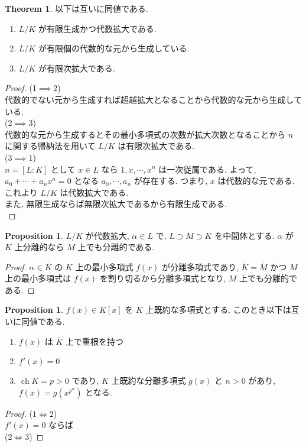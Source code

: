 \documentclass[a4paper,dvipdfmx]{jsarticle}
\DeclareMathOperator{\ch}{ch}
\theoremstyle{plain}
\theoremstyle{definition}
\theoremstyle{plain}
\numberwithin{equation}{section}
\numberwithin{theorem}{section}
\numberwithin{definition}{section}
\numberwithin{note}{section}
\theoremstyle{definition}
\newtheorem{prop}[dfn]{Proposition}
\newtheorem{thm}[dfn]{Theorem}
\begin{document}
\begin{thm}
  以下は互いに同値である.
  \begin{enumerate}
    \item $L/K$ が有限生成かつ代数拡大である.
    \item $L/K$ が有限個の代数的な元から生成している.
    \item $L/K$ が有限次拡大である.
  \end{enumerate}
\end{thm}
\begin{proof}
  (1$\implies$2) \\
  代数的でない元から生成すれば超越拡大となることから代数的な元から生成している. \\
  (2$\implies$3) \\
  代数的な元から生成するとその最小多項式の次数が拡大次数となることから $n$ に関する帰納法を用いて $L/K$ は有限次拡大である. \\
  (3$\implies$1) \\
  $n = [L : K]$ として $x\in L$ なら $1, x, \cdots, x^n$ は一次従属である. よって, $a_0+\cdots+a_nx^n = 0$ となる $a_0,\cdots,a_n$ が存在する. つまり, $x$ は代数的な元である. これより $L/K$ は代数拡大である. \\
  また, 無限生成ならば無限次拡大であるから有限生成である. \\
\end{proof}

\begin{prop}
  $L/K$ が代数拡大, $\alpha\in L$ で, $L\supset M\supset K$ を中間体とする. $\alpha$ が $K$ 上分離的なら $M$ 上でも分離的である.
\end{prop}
\begin{proof}
  $\alpha\in\overline{K}$ の $K$ 上の最小多項式 $f(x)$ が分離多項式であり, $\overline{K} = \overline{M}$ かつ $M$ 上の最小多項式は $f(x)$ を割り切るから分離多項式となり, $M$ 上でも分離的である.
\end{proof}

\begin{prop}
  $f(x)\in K[x]$ を $K$ 上既約な多項式とする. このとき以下は互いに同値である.
  \begin{enumerate}
    \item $f(x)$ は $\overline{K}$ 上で重根を持つ
    \item $f'(x) = 0$
    \item $\ch K = p > 0$ であり, $K$ 上既約な分離多項式 $g(x)$ と $n > 0$ があり, $f(x) = g(x^{p^n})$ となる.
  \end{enumerate}
\end{prop}
\begin{proof}
  ($1\iff 2$) \\
  $f'(x) = 0$ ならば \\
  ($2\iff 3$)
\end{proof}
\end{document}
